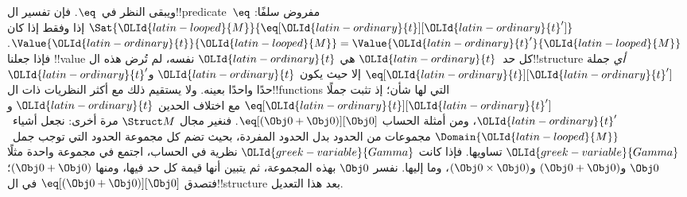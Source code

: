 \documentclass[../../../include/open-logic-section]{subfiles}
\begin{document}
{ويبقى النظر في~$\eq$. فإن تفسير ال!!{predicate}~$\eq$ مفروض
سلفًا: $\Sat{{\OLId{latin-looped}{M}}}{\eq[{\OLId{latin-ordinary}{t}}][{\OLId{latin-ordinary}{t}}']}$ إذا وفقط إذا كان
$\Value{{\OLId{latin-ordinary}{t}}}{{\OLId{latin-looped}{M}}} = \Value{{\OLId{latin-ordinary}{t}}'}{{\OLId{latin-looped}{M}}}$. فإذا جعلنا !!{value} كل حد~${\OLId{latin-ordinary}{t}}$
هي ${\OLId{latin-ordinary}{t}}$ نفسه، لم تُرض هذه ال!!{structure} \emph{أي} جملة
$\eq[{\OLId{latin-ordinary}{t}}][{\OLId{latin-ordinary}{t}}']$ إلا حيث يكون ${\OLId{latin-ordinary}{t}}$ و${\OLId{latin-ordinary}{t}}'$ حدًا واحدًا بعينه. ولا يستقيم
ذلك مع أكثر النظريات ذات ال!!{function}s التي لها شأن؛ إذ تثبت
جملًا $\eq[{\OLId{latin-ordinary}{t}}][{\OLId{latin-ordinary}{t}}']$ مع اختلاف الحدين ${\OLId{latin-ordinary}{t}}$ و${\OLId{latin-ordinary}{t}}'$، ومن أمثلة الحساب
$\eq[(\Obj 0+ \Obj 0)][\Obj 0]$. فنغير مجال $\Struct M$ مرة أخرى:
نجعل أشياء~$\Domain{{\OLId{latin-looped}{M}}}$ مجموعات من الحدود بدل الحدود المفردة،
بحيث تضم كل مجموعة الحدود التي توجب جمل~${\OLId{greek-variable}{Gamma}}$ تساويها.
فإذا كانت ${\OLId{greek-variable}{Gamma}}$ نظرية في الحساب، اجتمع في مجموعة واحدة مثلًا
$\Obj 0$ و$(\Obj 0 + \Obj 0)$ و$(\Obj
0 \times \Obj 0)$، وما إليها. نفسر $\Obj 0$ بهذه المجموعة، ثم
يتبين أنها قيمة كل حد فيها، ومنها $(\Obj 0 + \Obj 0)$؛ فتصدق
$\eq[(\Obj 0+ \Obj 0)][\Obj 0]$ في ال!!{structure} بعد هذا
التعديل.}{}
\end{document}

